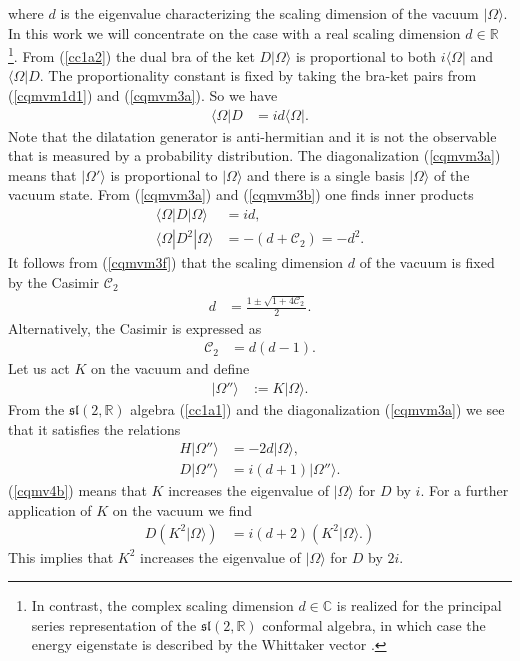 \documentclass[12pt]{article}
\numberwithin{equation}{section}
\begin{document}
where $d$ is the eigenvalue 
characterizing the scaling dimension of the vacuum $|\Omega\rangle$.  
In this work we will concentrate on 
the case with a real scaling dimension $d\in \mathbb{R}$ 
\footnote{
In contrast, the complex scaling dimension $d\in \mathbb{C}$ is realized for 
the principal series representation of 
the $\mathfrak{sl}(2,\mathbb{R})$ conformal algebra, 
in which case the energy eigenstate is described by the Whittaker vector 
\cite{Okazaki:2015lpa}. }. 
From (\ref{cc1a2}) the dual bra of the ket $D|\Omega\rangle$ 
is proportional to both $i\langle \Omega|$ and $\langle \Omega|D$. 
The proportionality constant is fixed by 
taking the bra-ket pairs from (\ref{cqmvm1d1}) and (\ref{cqmvm3a}). 
So we have 
\begin{align}
\label{cqmvm3b}
\langle \Omega|D&=id\langle \Omega|. 
\end{align}
Note that 
the dilatation generator is anti-hermitian 
and it is not the observable that is measured by a probability distribution. 
The diagonalization (\ref{cqmvm3a}) means that 
$|\Omega'\rangle$ is proportional to $|\Omega\rangle$ 
and there is a single basis $|\Omega\rangle$ of the vacuum state. 
%
From (\ref{cqmvm3a}) and (\ref{cqmvm3b}) one finds inner products
\begin{align}
\label{cqmvm3d}
\langle \Omega|D|\Omega\rangle&=id,\\
\label{cqmvm3f}
\langle \Omega|D^{2}|\Omega\rangle&=-(d+\mathcal{C}_{2})=-d^{2}.
\end{align}
It follows from (\ref{cqmvm3f}) that 
the scaling dimension $d$ of the vacuum is fixed by 
the Casimir $\mathcal{C}_{2}$
\begin{align}
\label{cqmv3g}
d&=\frac{1\pm\sqrt{1+4\mathcal{C}_{2}}}{2}.
\end{align}
Alternatively, the Casimir is expressed as 
\begin{align}
\label{cqmv3h}
\mathcal{C}_{2}&=d(d-1). 
\end{align}
%
Let us act $K$ on the vacuum and define
\begin{align}
\label{cqmvm2a}
|\Omega''\rangle&:=K|\Omega\rangle. 
\end{align}
From the $\mathfrak{sl}(2,\mathbb{R})$ algebra (\ref{cc1a1}) 
and the diagonalization (\ref{cqmvm3a}) we see that it satisfies the relations
\begin{align}
\label{cqmv4a}
H|\Omega''\rangle&=
-2d|\Omega\rangle,\\
\label{cqmv4b}
D|\Omega''\rangle&=
i(d+1)|\Omega''\rangle. 
\end{align}
(\ref{cqmv4b}) means that 
$K$ increases the eigenvalue of $|\Omega\rangle$ for $D$ 
by $i$. 
For a further application of $K$ on the vacuum 
we find 
\begin{align}
\label{cqmv4c}
D\left(
K^{2}|\Omega\rangle
\right)
&=
i(d+2)\left(
K^{2}|\Omega\rangle. 
\right) 
\end{align}
This implies that 
$K^{2}$ increases the eigenvalue of $|\Omega\rangle$ for $D$ by $2i$. 
\end{document}
